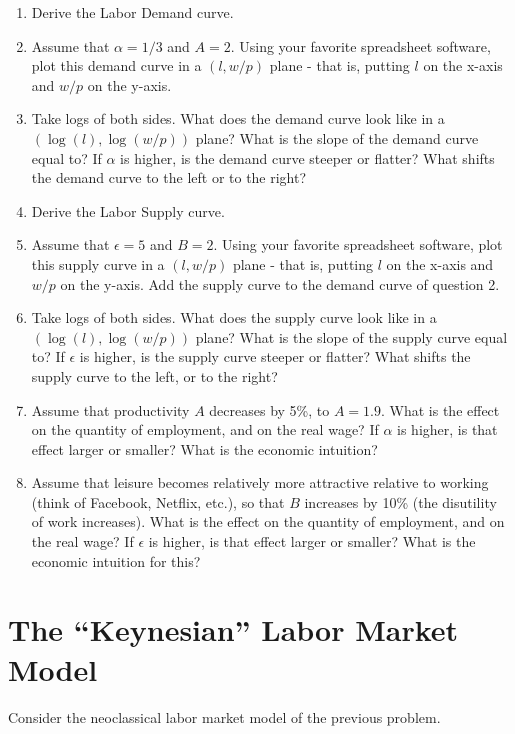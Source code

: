 \documentclass[]{book}
\theoremstyle{definition}
\theoremstyle{definition}
\theoremstyle{definition}
\theoremstyle{remark}
\begin{document}
\begin{enumerate}
\def\labelenumi{\arabic{enumi}.}
\item
  Derive the Labor Demand curve.
\item
  Assume that \(\alpha=1/3\) and \(A=2\). Using your favorite
  spreadsheet software, plot this demand curve in a \((l, w/p)\) plane -
  that is, putting \(l\) on the x-axis and \(w/p\) on the y-axis.
\item
  Take logs of both sides. What does the demand curve look like in a
  \((\log(l), \log(w/p))\) plane? What is the slope of the demand curve
  equal to? If \(\alpha\) is higher, is the demand curve steeper or
  flatter? What shifts the demand curve to the left or to the right?
\item
  Derive the Labor Supply curve.
\item
  Assume that \(\epsilon=5\) and \(B=2\). Using your favorite
  spreadsheet software, plot this supply curve in a \((l, w/p)\) plane -
  that is, putting \(l\) on the x-axis and \(w/p\) on the y-axis. Add
  the supply curve to the demand curve of question 2.
\item
  Take logs of both sides. What does the supply curve look like in a
  \((\log(l), \log(w/p))\) plane? What is the slope of the supply curve
  equal to? If \(\epsilon\) is higher, is the supply curve steeper or
  flatter? What shifts the supply curve to the left, or to the right?
\item
  Assume that productivity \(A\) decreases by 5\%, to \(A=1.9\). What is
  the effect on the quantity of employment, and on the real wage? If
  \(\alpha\) is higher, is that effect larger or smaller? What is the
  economic intuition?
\item
  Assume that leisure becomes relatively more attractive relative to
  working (think of Facebook, Netflix, etc.), so that \(B\) increases by
  10\% (the disutility of work increases). What is the effect on the
  quantity of employment, and on the real wage? If \(\epsilon\) is
  higher, is that effect larger or smaller? What is the economic
  intuition for this?
\end{enumerate}

\section{\texorpdfstring{The ``Keynesian'' Labor Market
Model}{The Keynesian Labor Market Model}}\label{the-keynesian-labor-market-model}

Consider the neoclassical labor market model of the previous problem.
\end{document}
